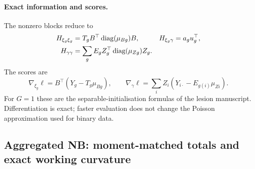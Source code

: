 \documentclass[11pt,a4paper]{article}
\newcommand{\diag}{\operatorname{diag}}
\numberwithin{equation}{section}
\begin{document}
\paragraph{Exact information and scores.}
The nonzero blocks reduce to
\begin{align}\label{eq:separable-poisson}
 H_{\xi_g\xi_g}&=T_g B^\top\diag(\mu_{Bg})B,&
 H_{\xi_g\gamma}&=a_gu_g^\top,\\
 H_{\gamma\gamma}&=\sum_gE_g Z_g^\top\diag(\mu_{Zg})Z_g.\notag
\end{align}
The scores are
\[
 \nabla_{\xi_g}\ell=B^\top(Y_g-T_g\mu_{Bg}),\qquad
 \nabla_\gamma\ell=\sum_iZ_i(Y_{i\cdot}-E_{g(i)}\mu_{Zi}).
\]
For $G=1$ these are the separable-initialisation formulas of the lesion
manuscript. Differentiation is exact; faster evaluation does not change
the Poisson approximation used for binary data.

\subsection{Aggregated NB: moment-matched totals and exact working curvature}\label{sec:aggregate}
\end{document}
